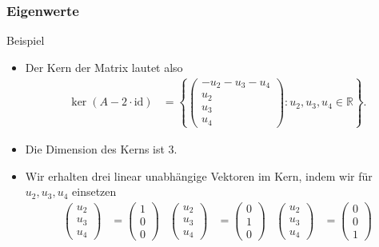 \documentclass{beamer}
\newcommand\RR{\mathbb R}
\newcommand{\id}{\mathrm{id}}
\newcommand\cbc[1]{\left\{{#1}\right\}}
\renewcommand{\ae}{\"a}
\newcommand{\ue}{\"u}
\newcommand{\mytitle}{Eigenwerte}
\begin{document}
\begin{frame}\frametitle{\mytitle}
	\begin{block}{Beispiel}
	\begin{itemize}
		\item Der Kern der Matrix lautet also
\begin{align*}
	\ker(A-2\cdot\id)&=\cbc{\begin{pmatrix}-u_2-u_3-u_4\\u_2\\u_3\\u_4\end{pmatrix}:u_2,u_3,u_4\in\RR}.
			\end{align*}
		\item Die Dimension des Kerns ist 3.
		\item Wir erhalten drei linear unabh\ae ngige Vektoren im Kern, indem wir f\ue r $u_2,u_3,u_4$ einsetzen
			\begin{align*}
				\begin{pmatrix} u_2\\u_3\\u_4 \end{pmatrix}&=\begin{pmatrix}1\\0\\0\end{pmatrix}&
				\begin{pmatrix} u_2\\u_3\\u_4 \end{pmatrix}&=\begin{pmatrix}0\\1\\0\end{pmatrix}&
				\begin{pmatrix} u_2\\u_3\\u_4 \end{pmatrix}&=\begin{pmatrix}0\\0\\1\end{pmatrix}
			\end{align*}
	\end{itemize}
	\end{block}
\end{frame}
\end{document}
